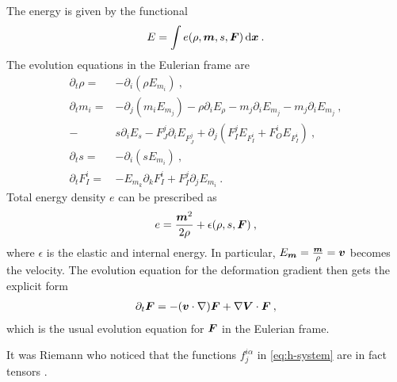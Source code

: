 \begin{example}
    The energy is given by the functional
    \begin{align}
        E = \int e(\rho, \boldsymbol{m}, s, \boldsymbol{F}) \, \mathrm{d} \boldsymbol{x} \:.
    \end{align}
    The evolution equations in the Eulerian frame are
    \begin{align}
        \partial_t \rho =& - \partial_i (\rho E_{m_i}) \:,
        \\
        \partial_t m_i =& - \partial_j(m_i E_{m_j}) - \rho \partial_i E_\rho - m_j \partial_i E_{m_j} - m_j \partial_i E_{m_j} \:,
        \\
        -& s \partial_i E_s - F^j_J \partial_i E_{F^j_J} + \partial_j(F^j_I E_{F^i_I} + F^i_O E_{F^i_I}) \:,
        \\
        \partial_t s =& - \partial_i (sE_{m_i}) \:,
        \\
        \partial_t F^i_I =& - E_{m_k} \partial_k F^i_I + F^j_I \partial_j E_{m_i} \:.
    \end{align}
    Total energy density $e$ can be prescribed as
    \begin{align}
        e = \frac{\boldsymbol{m}^2}{2 \rho} + \epsilon(\rho,s , \boldsymbol{F}) \:,
    \end{align}
    where $\epsilon$ is the elastic and internal energy. In particular, $E_{\boldsymbol{m}} = \frac{\boldsymbol{m}}{\rho} = \boldsymbol{v}$ becomes the velocity. The evolution equation for the deformation gradient then gets the explicit form
    \begin{align}
        \partial_t \boldsymbol{F} = -(\boldsymbol{v} \cdot \nabla) \boldsymbol{F} + \nabla \boldsymbol{V} \cdot \boldsymbol{F} \:,
    \end{align}
    which is the usual evolution equation for $\boldsymbol{F}$ in the Eulerian frame.
\end{example}

It was Riemann who noticed that the functions $f^{i \alpha}_j$ in \eqref{eq:h-system} are in fact tensors \cite{Dubrovin-Novikov}.

